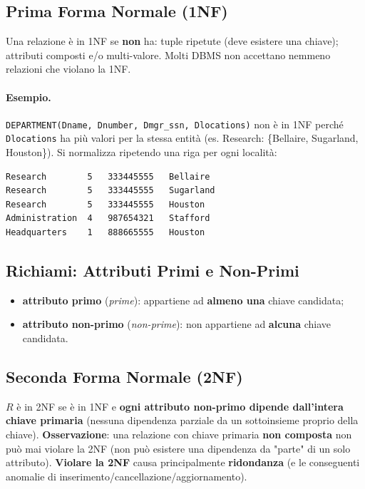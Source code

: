 \documentclass[12pt, a4paper]{article}
\begin{document}
\subsection{Prima Forma Normale (1NF)}
Una relazione è in 1NF se \textbf{non} ha: tuple ripetute (deve esistere una chiave); attributi composti e/o multi-valore. Molti DBMS non accettano nemmeno relazioni che violano la 1NF.

\paragraph{Esempio.} \texttt{DEPARTMENT(Dname, Dnumber, Dmgr\_ssn, Dlocations)} non è in 1NF perché \texttt{Dlocations} ha più valori per la stessa entità (es. Research: \{Bellaire, Sugarland, Houston\}). Si normalizza ripetendo una riga per ogni località:
\begin{verbatim}
Research        5   333445555   Bellaire
Research        5   333445555   Sugarland
Research        5   333445555   Houston
Administration  4   987654321   Stafford
Headquarters    1   888665555   Houston
\end{verbatim}

\subsection{Richiami: Attributi Primi e Non-Primi}
\begin{itemize}
    \item \textbf{attributo primo} (\textit{prime}): appartiene ad \textbf{almeno una} chiave candidata;
    \item \textbf{attributo non-primo} (\textit{non-prime}): non appartiene ad \textbf{alcuna} chiave candidata.
\end{itemize}

\subsection{Seconda Forma Normale (2NF)}
$R$ è in 2NF se è in 1NF e \textbf{ogni attributo non-primo dipende dall'intera chiave primaria} (nessuna dipendenza parziale da un sottoinsieme proprio della chiave). \textbf{Osservazione}: una relazione con chiave primaria \textbf{non composta} non può mai violare la 2NF (non può esistere una dipendenza da "parte" di un solo attributo). \textbf{Violare la 2NF} causa principalmente \textbf{ridondanza} (e le conseguenti anomalie di inserimento/cancellazione/aggiornamento).
\end{document}
